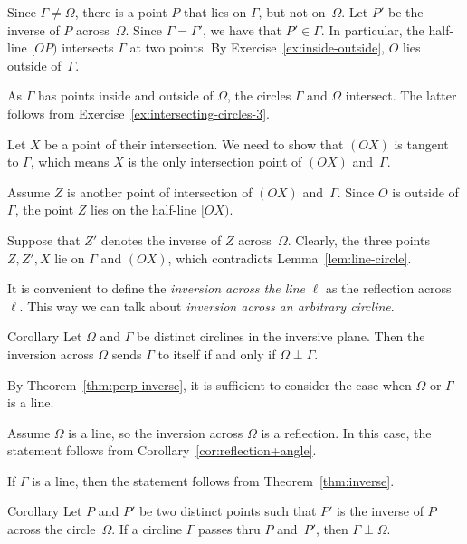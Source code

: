 Since $\Gamma\ne \Omega$, there is a point $P$ that lies on $\Gamma$, but not on~$\Omega$.
Let $P'$ be the inverse of $P$ across~$\Omega$.
Since $\Gamma=\Gamma'$, we have that $P'\in \Gamma$.
In particular, the half-line $[OP)$ intersects $\Gamma$ at two points.
By Exercise~\ref{ex:inside-outside}, 
 $O$ lies outside of~$\Gamma$.

As $\Gamma$ has points inside and outside of $\Omega$,
the circles $\Gamma$ and $\Omega$ intersect.
The latter follows from Exercise~\ref{ex:intersecting-circles-3}.

Let $X$ be a point of their intersection.
We need to show that $(OX)$ is tangent to $\Gamma$, which means $X$ is the only intersection point of $(OX)$ and~$\Gamma$.

Assume $Z$ is another point of intersection of $(OX)$ and~$\Gamma$.
Since $O$ is outside of $\Gamma$, 
the point $Z$ lies on the half-line $[OX)$.

Suppose that $Z'$ denotes the inverse of $Z$ across~$\Omega$.
Clearly, the three points $Z, Z', X$ lie on $\Gamma$ and $(OX)$, which contradicts Lemma~\ref{lem:line-circle}.
\qeds 

It is convenient to define the 
\emph{inversion across the line} $\ell$
as the reflection across $\ell$.
This way we can talk about \emph{inversion across an arbitrary circline}.

\begin{thm}{Corollary}\label{cor:perp-inverse-clines}
Let $\Omega$  and $\Gamma$ be distinct circlines in the inversive plane.
Then
the inversion across $\Omega$ sends $\Gamma$ to itself if and only if $\Omega\perp\Gamma$.
\end{thm}

By Theorem~\ref{thm:perp-inverse}, it is sufficient to consider the case when $\Omega$ or $\Gamma$ is a line.

Assume $\Omega$ is a line, so the inversion across $\Omega$ is a reflection.
In this case, the statement follows from Corollary~\ref{cor:reflection+angle}.

If $\Gamma$ is a line, 
then the statement follows from Theorem~\ref{thm:inverse}.
\qeds

\begin{thm}{Corollary}\label{cor:perp-inverse}
Let $P$ and $P'$ be two distinct points
such that $P'$ is the inverse of $P$ across the circle~$\Omega$.
If a circline $\Gamma$ passes thru $P$ and~$P'$, then $\Gamma\perp\Omega$.
\end{thm}

